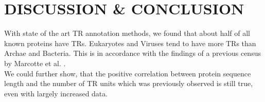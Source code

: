 \documentclass[a4,center,fleqn]{NAR}
\begin{document}
%
%
%
%
%
%
%


%
%



\section{DISCUSSION \& CONCLUSION}
With state of the art TR annotation methods, we found that about half of all known proteins have TRs. Eukaryotes and Viruses tend to have more TRs than Archae and Bacteria. This is in accordance with the findings of a previous census by Marcotte et al. \cite{Marcotte1999}. \\
We could further show, that the positive correlation between protein sequence length and the number of TR units which was previously observed \cite{Marcotte1999} is still true, even with largely increased data.
\end{document}
